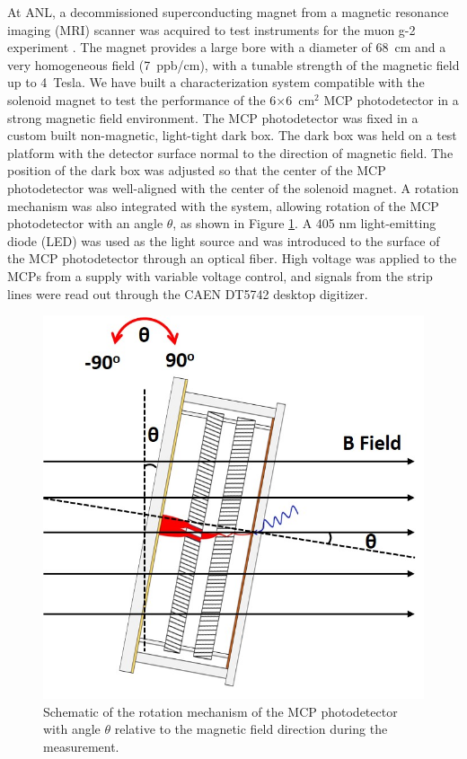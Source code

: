 \documentclass[preprint,5p]{elsarticle}
\begin{document}
At ANL, a decommissioned superconducting magnet from a magnetic resonance 
imaging (MRI) scanner was acquired to test instruments for the muon g-2 
experiment \cite{Magnet}. The magnet provides a large bore with a diameter of 
68~cm and a very homogeneous field (7~ppb/cm), with a tunable strength of the 
magnetic field up to 4~Tesla. We have built a characterization system 
compatible with the solenoid magnet to test the performance of the 
6$\times$6~cm$^2$ MCP photodetector in a strong magnetic field environment.  
The MCP photodetector was fixed in a custom built non-magnetic, light-tight 
dark box. The dark box was held on a test platform with the detector surface 
normal to the direction of magnetic field. The position of the dark box was 
adjusted so that the center of the MCP photodetector was well-aligned with the 
center of the solenoid magnet. A rotation mechanism was also integrated with 
the system, allowing rotation of the MCP photodetector with an angle 
$\theta$, as shown in Figure \ref{fig:MCPs_theta_rotation}. A 405 nm 
light-emitting diode (LED) was used as the light source and was introduced to 
the surface of the MCP photodetector through an optical fiber. High voltage was 
applied to the MCPs from a supply with variable voltage control, and signals 
from the strip lines were read out through the CAEN DT5742 desktop digitizer.

\begin{figure}[tbp]
\centering 
\includegraphics[scale=0.27]{fig/MCPs_theta_rotation.png}
\caption{Schematic of the rotation mechanism of the MCP photodetector 
with angle $\theta$ relative to the magnetic field direction during the 
measurement.} \label{fig:MCPs_theta_rotation}
\end{figure}
\end{document}
